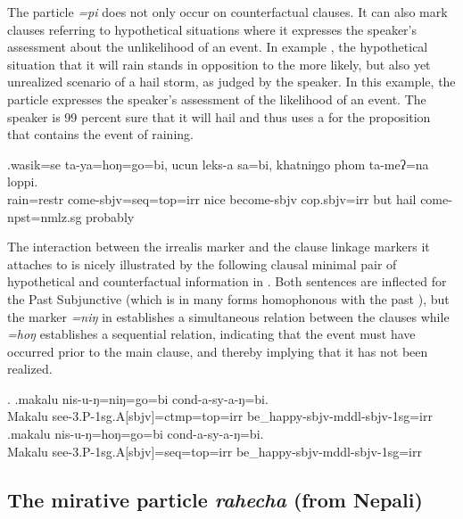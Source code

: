 	
The particle \emph{=pi} does not only occur on counterfactual clauses. It can also mark clauses referring to hypothetical situations where it expresses the speaker's assessment about the unlikelihood of an event. In example \Next, the hypothetical situation that it will rain stands in opposition to the more likely, but also yet unrealized scenario of a hail storm, as judged by the speaker. In this example, the particle expresses the speaker's assessment of the likelihood of an event. The speaker is 99 percent sure that it will hail and thus uses a   for  the proposition that contains the event of raining. 

\exg.wasik=se ta-ya=hoŋ=go=bi, ucun leks-a sa=bi, khatniŋgo phom ta-meʔ=na loppi.\\
 rain{\sc =restr} come{\sc [3sg]-sbjv=seq=top=irr} nice become{\sc [3sg]-sbjv} {\sc cop.sbjv=irr} but hail come{\sc [3sg]-npst=nmlz.sg} probably\\


The interaction between the irrealis marker and the clause linkage markers it attaches to is nicely illustrated by the following clausal minimal pair of hypothetical and counterfactual information in \Next. Both sentences are inflected for the Past Subjunctive (which is in many forms homophonous with the past ), but the  marker \emph{=niŋ} in \Next[a] establishes a simultaneous relation between the clauses while  \emph{=hoŋ} \Next[b] establishes a sequential relation, indicating that the event must have occurred prior to the main clause, and thereby implying that it has  not been realized. 

\ex. \ag.makalu nis-u-ŋ=niŋ=go=bi cond-a-sy-a-ŋ=bi.\\
Makalu see{\sc -3.P-1sg.A[sbjv]=ctmp=top=irr} be\_happy{\sc -sbjv-mddl-sbjv-1sg=irr}\\
\bg.makalu nis-u-ŋ=hoŋ=go=bi cond-a-sy-a-ŋ=bi.\\
Makalu see{\sc -3.P-1sg.A[sbjv]=seq=top=irr} be\_happy{\sc -sbjv-mddl-sbjv-1sg=irr}\\


\subsection{The mirative particle \emph{rahecha} (from {Nepali})}   
 
